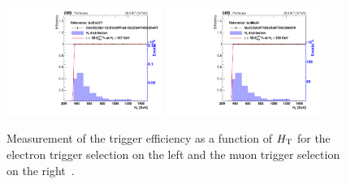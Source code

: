 \begin{figure}[!h]
  \begin{center}
    \includegraphics[width=0.45\textwidth]{Plots/trigger/HT_IsoEle27T_EffFit_test_HLT_Ele105ORHLT_Ele115ORHLT_Ele50PFJet165ORHLT_EleHT400ORHLT_EleHT350ORHLT_MetOR.pdf}
    \includegraphics[width=0.45\textwidth]{Plots/trigger/HT_IsoMu24_EffFit_test_HLT_Mu50ORHLT_MuHT400ORHLT_MuHT350ORHLT_MetOR.pdf}
  \end{center}
  \caption[The trigger efficiency as a function of $\HT$]{Measurement of the trigger efficiency as a function of $\HT$ for the electron trigger selection on the left and the muon trigger selection  on the right~\cite{trigger}.
  \label{fig:trig_eff_HT}}
  \end{figure}
